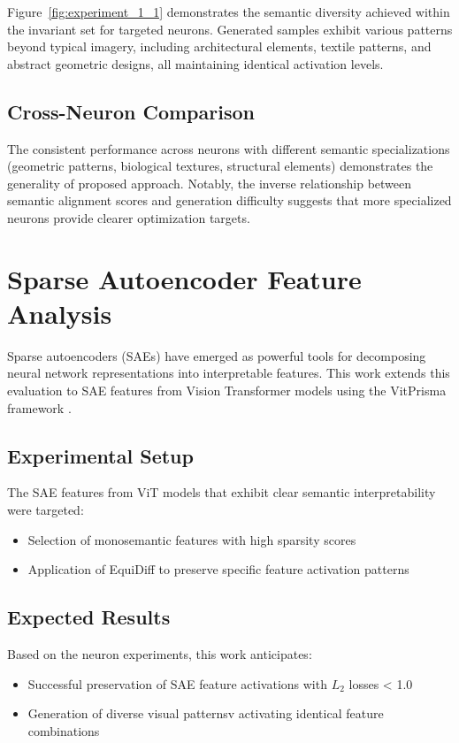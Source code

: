 \documentclass[licencjacka,en]{pracamgr}
\newcommand{\method}[1]{EquiDiff}  %
\begin{document}
Figure~\ref{fig:experiment_1_1} demonstrates the semantic diversity achieved within the invariant set for targeted neurons. Generated samples exhibit various patterns beyond typical imagery, including architectural elements, textile patterns, and abstract geometric designs, all maintaining identical activation levels.

\subsection{Cross-Neuron Comparison}

The consistent performance across neurons with different semantic specializations (geometric patterns, biological textures, structural elements) demonstrates the generality of proposed approach. Notably, the inverse relationship between semantic alignment scores and generation difficulty suggests that more specialized neurons provide clearer optimization targets.

\section{Sparse Autoencoder Feature Analysis}

Sparse autoencoders (SAEs) have emerged as powerful tools for decomposing neural network representations into interpretable features. This work extends this evaluation to SAE features from Vision Transformer models using the VitPrisma framework \citep{joseph2025prismaopensourcetoolkit}.

\subsection{Experimental Setup}

The SAE features from ViT models that exhibit clear semantic interpretability were targeted:
\begin{itemize}
\item Selection of monosemantic features with high sparsity scores
\item Application of \method{} to preserve specific feature activation patterns
\end{itemize}

\subsection{Expected Results}

Based on the neuron experiments, this work anticipates:
\begin{itemize}
\item Successful preservation of SAE feature activations with $L_2$ losses < 1.0
\item Generation of diverse visual patternsv activating identical feature combinations
\end{itemize}
\end{document}
